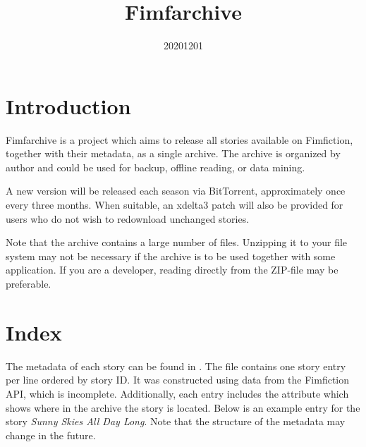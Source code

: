 \documentclass[hidelinks,a4paper,12pt]{article}
\begin{document}
\title{Fimfarchive}
\date{20201201}

\maketitle
\newpage
\tableofcontents
\newpage

\section{Introduction} \label{sec:introduction}

Fimfarchive is a project which aims to release all stories available on Fimfiction, together with their metadata, as a single archive. The archive is organized by author and could be used for backup, offline reading, or data mining.

A new version will be released each season via BitTorrent, approximately once every three months. When suitable, an xdelta3 patch will also be provided for users who do not wish to redownload unchanged stories.

Note that the archive contains a large number of files. Unzipping it to your file system may not be necessary if the archive is to be used together with some application. If you are a developer, reading directly from the ZIP-file may be preferable.


\section{Index} \label{sec:index}

The metadata of each story can be found in . The file contains one story entry per line ordered by story ID. It was constructed using data from the Fimfiction API, which is incomplete. Additionally, each entry includes the attribute  which shows where in the archive the story is located. Below is an example entry for the story \emph{Sunny Skies All Day Long}. Note that the structure of the metadata may change in the future.
\end{document}
